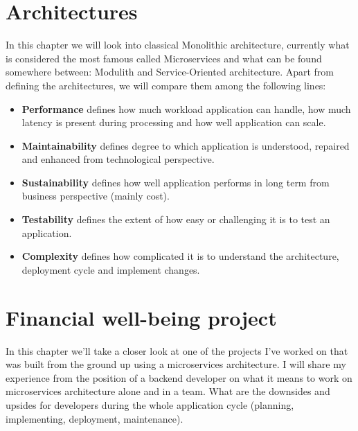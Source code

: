 \chapter{Architectures}
\label{chapter:architectures}
In this chapter we will look into classical Monolithic architecture, currently what is considered the most famous called Microservices and what can be found somewhere between: Modulith and Service-Oriented architecture. Apart from defining the architectures, we will compare them among the following lines:
\begin{itemize}
    \item \textbf{Performance} defines how much workload application can handle, how much latency is present during processing and how well application can scale.
    \item \textbf{Maintainability} defines degree to which application is understood, repaired and enhanced from technological perspective.  \cite{SOFTWARE_MAINTAINABILITY}
    \item \textbf{Sustainability} defines how well application performs in long term from business perspective (mainly cost).
    \item \textbf{Testability} defines the extent of how easy or challenging it is to test an application.
    \item \textbf{Complexity} defines how complicated it is to understand the architecture, deployment cycle and implement changes.
\end{itemize}








\chapter{Financial well-being project}
\label{chapter:personal_experience}
In this chapter we'll take a closer look at one of the projects I've worked on that was built from the ground up using a microservices architecture. I will share my experience from the position of a backend developer on what it means to work on microservices architecture alone and in a team. What are the downsides and upsides for developers during the whole application cycle (planning, implementing, deployment, maintenance).



